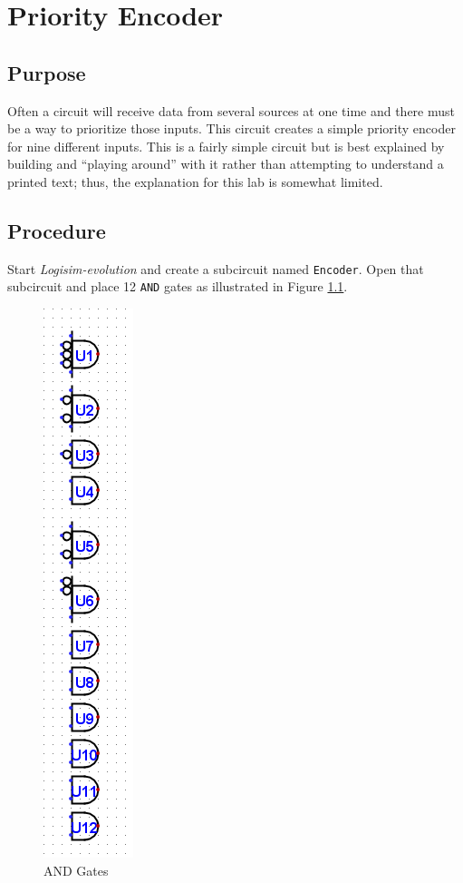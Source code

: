 \chapter{Priority Encoder}

\section{Purpose}

Often a circuit will receive data from several sources at one time and there must be a way to prioritize those inputs. This circuit creates a simple priority encoder for nine different inputs. This is a fairly simple circuit but is best explained by building and ``playing around'' with it rather than attempting to understand a printed text; thus, the explanation for this lab is somewhat limited.

\section{Procedure}

Start \textit{Logisim-evolution} and create a subcircuit named \lstinline[columns=fixed]|Encoder|. Open that subcircuit and place 12 \texttt{AND} gates as illustrated in Figure \ref{fig:03-01}.

\begin{figure}[H]
	\centering
	\includegraphics[width=\maxwidth{.95\linewidth}]{gfx/03-01}
	\caption{AND Gates}
	\label{fig:03-01}
\end{figure}

